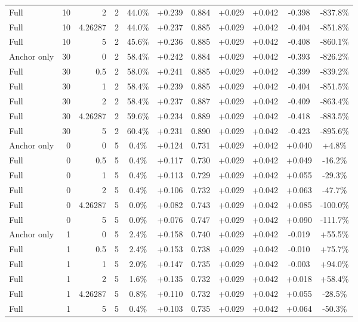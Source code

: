 \begin{table}[htbp]
\begin{tabular}{lrrrccccccc}
Full & 10 & 2 & 2 & 44.0\% & +0.239 & 0.884 & +0.029 & +0.042 & -0.398 & -837.8\% \\
Full & 10 & 4.26287 & 2 & 44.0\% & +0.237 & 0.885 & +0.029 & +0.042 & -0.404 & -851.8\% \\
Full & 10 & 5 & 2 & 45.6\% & +0.236 & 0.885 & +0.029 & +0.042 & -0.408 & -860.1\% \\
Anchor only & 30 & 0 & 2 & 58.4\% & +0.242 & 0.884 & +0.029 & +0.042 & -0.393 & -826.2\% \\
Full & 30 & 0.5 & 2 & 58.0\% & +0.241 & 0.885 & +0.029 & +0.042 & -0.399 & -839.2\% \\
Full & 30 & 1 & 2 & 58.4\% & +0.239 & 0.885 & +0.029 & +0.042 & -0.404 & -851.5\% \\
Full & 30 & 2 & 2 & 58.4\% & +0.237 & 0.887 & +0.029 & +0.042 & -0.409 & -863.4\% \\
Full & 30 & 4.26287 & 2 & 59.6\% & +0.234 & 0.889 & +0.029 & +0.042 & -0.418 & -883.5\% \\
Full & 30 & 5 & 2 & 60.4\% & +0.231 & 0.890 & +0.029 & +0.042 & -0.423 & -895.6\% \\
Anchor only & 0 & 0 & 5 & 0.4\% & +0.124 & 0.731 & +0.029 & +0.042 & +0.040 & +4.8\% \\
Full & 0 & 0.5 & 5 & 0.4\% & +0.117 & 0.730 & +0.029 & +0.042 & +0.049 & -16.2\% \\
Full & 0 & 1 & 5 & 0.4\% & +0.113 & 0.729 & +0.029 & +0.042 & +0.055 & -29.3\% \\
Full & 0 & 2 & 5 & 0.4\% & +0.106 & 0.732 & +0.029 & +0.042 & +0.063 & -47.7\% \\
Full & 0 & 4.26287 & 5 & 0.0\% & +0.082 & 0.743 & +0.029 & +0.042 & +0.085 & -100.0\% \\
Full & 0 & 5 & 5 & 0.0\% & +0.076 & 0.747 & +0.029 & +0.042 & +0.090 & -111.7\% \\
Anchor only & 1 & 0 & 5 & 2.4\% & +0.158 & 0.740 & +0.029 & +0.042 & -0.019 & +55.5\% \\
Full & 1 & 0.5 & 5 & 2.4\% & +0.153 & 0.738 & +0.029 & +0.042 & -0.010 & +75.7\% \\
Full & 1 & 1 & 5 & 2.0\% & +0.147 & 0.735 & +0.029 & +0.042 & -0.003 & +94.0\% \\
Full & 1 & 2 & 5 & 1.6\% & +0.135 & 0.732 & +0.029 & +0.042 & +0.018 & +58.4\% \\
Full & 1 & 4.26287 & 5 & 0.8\% & +0.110 & 0.732 & +0.029 & +0.042 & +0.055 & -28.5\% \\
Full & 1 & 5 & 5 & 0.4\% & +0.103 & 0.735 & +0.029 & +0.042 & +0.064 & -50.3\% \\

\end{tabular}
\end{table}
